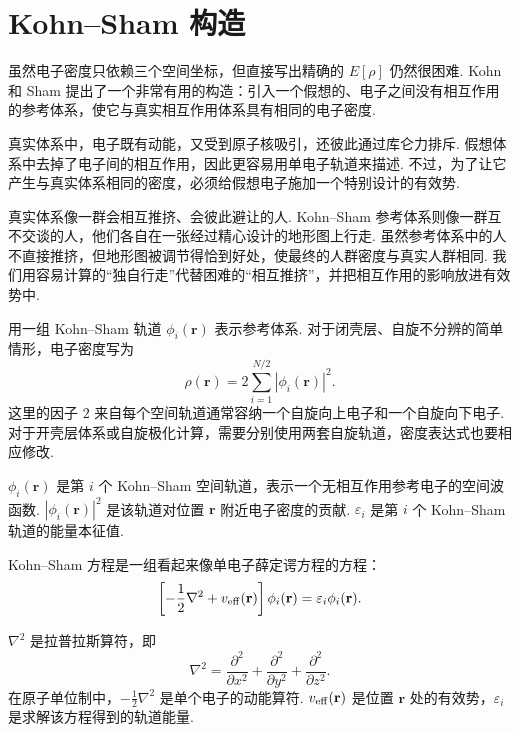 \documentclass[UTF8,11pt,a4paper,openany]{ctexbook}
\begin{document}
\section{Kohn--Sham 构造}

虽然电子密度只依赖三个空间坐标，但直接写出精确的 $E[\rho]$ 仍然很困难. Kohn 和 Sham 提出了一个非常有用的构造：引入一个假想的、电子之间没有相互作用的参考体系，使它与真实相互作用体系具有相同的电子密度. 

真实体系中，电子既有动能，又受到原子核吸引，还彼此通过库仑力排斥. 假想体系中去掉了电子间的相互作用，因此更容易用单电子轨道来描述. 不过，为了让它产生与真实体系相同的密度，必须给假想电子施加一个特别设计的有效势. 

\begin{analogybox}
真实体系像一群会相互推挤、会彼此避让的人. Kohn--Sham 参考体系则像一群互不交谈的人，他们各自在一张经过精心设计的地形图上行走. 虽然参考体系中的人不直接推挤，但地形图被调节得恰到好处，使最终的人群密度与真实人群相同. 我们用容易计算的“独自行走”代替困难的“相互推挤”，并把相互作用的影响放进有效势中. 
\end{analogybox}

用一组 Kohn--Sham 轨道 $\phi_i(\mathbf r)$ 表示参考体系. 对于闭壳层、自旋不分辨的简单情形，电子密度写为
\[
\rho(\mathbf r)=2\sum_{i=1}^{N/2}\left|\phi_i(\mathbf r)\right|^2.
\]
这里的因子 $2$ 来自每个空间轨道通常容纳一个自旋向上电子和一个自旋向下电子. 对于开壳层体系或自旋极化计算，需要分别使用两套自旋轨道，密度表达式也要相应修改. 

\begin{notationbox}
$\phi_i(\mathbf r)$ 是第 $i$ 个 Kohn--Sham 空间轨道，表示一个无相互作用参考电子的空间波函数. $\left|\phi_i(\mathbf r)\right|^2$ 是该轨道对位置 $\mathbf r$ 附近电子密度的贡献. $\varepsilon_i$ 是第 $i$ 个 Kohn--Sham 轨道的能量本征值. 
\end{notationbox}

Kohn--Sham 方程是一组看起来像单电子薛定谔方程的方程：
\[
\left[-\frac12\nabla^2+v_{\rm eff}(\mathbf r)\right]\phi_i(\mathbf r)
=
\varepsilon_i\phi_i(\mathbf r).
\]

\begin{notationbox}
$\nabla^2$ 是拉普拉斯算符，即
\[
\nabla^2=
\frac{\partial^2}{\partial x^2}
+
\frac{\partial^2}{\partial y^2}
+
\frac{\partial^2}{\partial z^2}.
\]
在原子单位制中，$-\frac12\nabla^2$ 是单个电子的动能算符. $v_{\rm eff}(\mathbf r)$ 是位置 $\mathbf r$ 处的有效势，$\varepsilon_i$ 是求解该方程得到的轨道能量. 
\end{notationbox}
\end{document}
